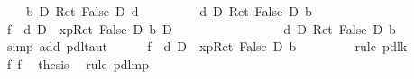 \begin{isabellebody}
\ \ {\isacharparenleft}\ {\isachardoublequote}{\isasymturnstile}\ {\isacharparenleft}{\isacharquery}b\ {\isasymlongrightarrow}\isactrlsub D\ Ret\ False{\isacharparenright}\ {\isasymlongrightarrow}\isactrlsub D\ {\isacharquery}d{\isachardoublequote}{\isacharparenright}\isanewline
\isamarkupfalse%
\ {\isacharminus}\isanewline
\ \ %
\isanewline
\ \ \isamarkupfalse%
\ {\isachardoublequote}{\isasymturnstile}\ {\isacharparenleft}{\isacharquery}d\ {\isasymlongrightarrow}\isactrlsub D\ Ret\ False{\isacharparenright}\ {\isasymlongrightarrow}\isactrlsub D\ {\isacharquery}b{\isachardoublequote}\ \isanewline
\ \ \isamarkupfalse%
\ {\isacharminus}\isanewline
\ \ \ \ %
\isanewline
\ \ \ \ \isamarkupfalse%
\ f{}{\isacharcolon}\ {\isachardoublequote}{\isasymturnstile}\ {\isacharparenleft}{\isacharparenleft}{\isacharquery}d\ {\isasymlongrightarrow}\isactrlsub D\ {\isacharbrackleft}{\isacharhash}\ x{\isasymleftarrow}p{\isacharbrackright}{\isacharparenleft}Ret\ False{\isacharparenright}{\isacharparenright}\ {\isasymlongrightarrow}\isactrlsub D\ {\isacharquery}b{\isacharparenright}\ {\isasymlongrightarrow}\isactrlsub D\ \isanewline
\ \ \ \ \ \ \ \ \ \ \ \ \ \ \ \ {\isacharparenleft}{\isacharquery}d\ {\isasymlongrightarrow}\isactrlsub D\ Ret\ False{\isacharparenright}\ {\isasymlongrightarrow}\isactrlsub D\ {\isacharquery}b{\isachardoublequote}\isanewline
\ \ \ \ \ \ \isamarkupfalse%
\ {\isacharparenleft}simp\ add{\isacharcolon}\ pdl{\isacharunderscore}taut{\isacharparenright}\isanewline
\ \ \ \ \isamarkupfalse%
\ f{}{\isacharcolon}\ {\isachardoublequote}{\isasymturnstile}\ {\isacharparenleft}{\isacharquery}d\ {\isasymlongrightarrow}\isactrlsub D\ {\isacharbrackleft}{\isacharhash}\ x{\isasymleftarrow}p{\isacharbrackright}{\isacharparenleft}Ret\ False{\isacharparenright}{\isacharparenright}\ {\isasymlongrightarrow}\isactrlsub D\ {\isacharquery}b{\isachardoublequote}\ \isanewline
\ \ \ \ \ \ \isamarkupfalse%
\ {\isacharparenleft}rule\ pdl{\isacharunderscore}k{}{\isacharparenright}\isanewline
\ \ \ \ \isamarkupfalse%
\ f{}\ f{}\ \isamarkupfalse%
\ {\isacharquery}thesis\ \isamarkupfalse%
\ {\isacharparenleft}rule\ pdl{\isacharunderscore}mp{\isacharparenright}\isanewline
\ \ \isamarkupfalse%
\isanewline
\ \ \isamarkupfalse%

\end{isabellebody}
